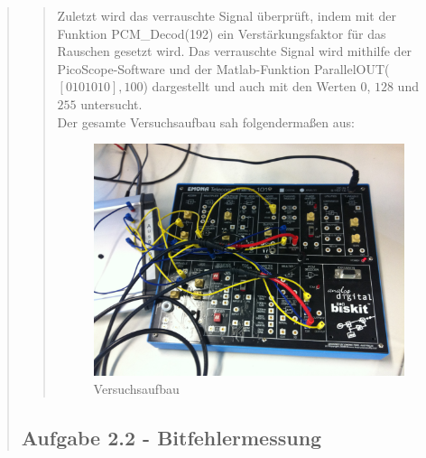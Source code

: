 \begin{quote}
\begin{quote}
        Zuletzt wird das verrauschte Signal überprüft, indem mit der Funktion
        PCM\_Decod(192) ein Verstärkungsfaktor für das Rauschen gesetzt wird.
        Das verrauschte Signal wird mithilfe der PicoScope-Software und der
        Matlab-Funktion ParallelOUT($[0 1 0 1 0 1 0],100$) dargestellt und auch
        mit den Werten $0$, $128$ und $255$ untersucht.\\
        
        Der gesamte Versuchsaufbau sah folgendermaßen aus:
        
         \begin{figure}[H]
        \centering
            \includegraphics[scale=0.13, trim = 1.5cm 0cm 1.5cm 0cm,
            clip]{./Bilder/aufgabe1/Versuchsaufbau.JPG}
                \caption{Versuchsaufbau}
        \end{figure}
        
        
    \end{quote}%
    
    \subsection{Aufgabe 2.2 - Bitfehlermessung}
    \begin{quote}
    

\end{quote}
\end{quote}
